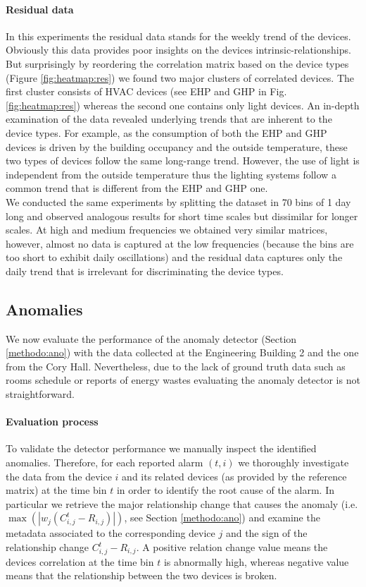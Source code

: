 \paragraph{Residual data}
In this experiments the residual data stands for the weekly trend of the devices.
Obviously this data provides poor insights on the devices intrinsic-relationships.
But surprisingly by reordering the correlation matrix based on the device types (Figure \ref{fig:heatmap:res}) we found two major clusters of correlated devices.
The first cluster consists of HVAC devices (see EHP and GHP in Fig. \ref{fig:heatmap:res}) whereas the second one contains only light devices. 
An in-depth examination of the data revealed underlying trends that are inherent to the device types. 
For example, as the consumption of both the EHP and GHP devices is driven by the building occupancy and the outside temperature, these two types of devices follow the same long-range trend. 
However, the use of light is independent from the outside temperature thus the lighting systems follow a common trend that is different from the EHP and GHP one.
~\\

We conducted the same experiments by splitting the dataset in 70 bins of 1 day long and observed analogous results for short time scales but dissimilar for longer scales.
At high and medium frequencies we obtained very similar matrices, however, almost no data is captured at the low frequencies (because the bins are too short to exhibit daily oscillations) and the residual data captures only the daily trend that is irrelevant for discriminating the device types.


\subsection{Anomalies}
We now evaluate the performance of the anomaly detector (Section \ref{methodo:ano}) with the data collected at the Engineering Building 2 and the one from the Cory Hall.
Nevertheless, due to the lack of ground truth data such as rooms schedule or reports of energy wastes evaluating the anomaly detector is not straightforward.

\paragraph{Evaluation process}
To validate the detector performance we manually inspect the identified anomalies.
Therefore, for each reported alarm $(t,i)$ we thoroughly investigate the data from the device $i$ and its related devices (as provided by the reference matrix) at the time bin $t$ in order to identify the root cause of the alarm.
In particular we retrieve the major relationship change that causes the anomaly (i.e. $\max(|w_j(C_{i,j}^t - R_{i,j})|)$, see Section \ref{methodo:ano}) and examine the metadata associated to the corresponding device $j$ and the sign of the relationship change $C_{i,j}^t - R_{i,j}$.
A positive relation change value means the devices correlation at the time bin $t$ is abnormally high, whereas negative value means that the relationship between the two devices is broken.

